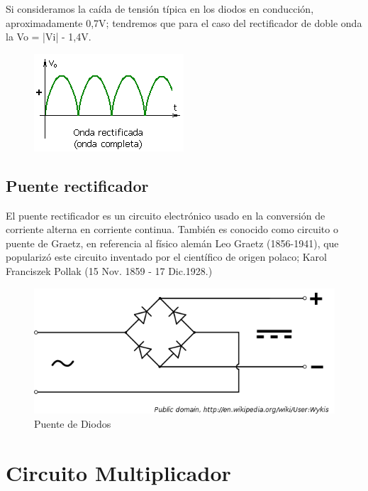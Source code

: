 \documentclass{article}
\begin{document}
   

Si consideramos la caída de tensión típica en los diodos en conducción, aproximadamente 0,7V; tendremos que para el caso del rectificador de doble onda la Vo = |Vi| - 1,4V.\citep{circuitoOnda}\\


\begin{figure}[h!]
    \centering
    \includegraphics[scale=0.8]{OndaCompleta.png}
    \label{fig:my_label}
\end{figure}

\subsection{Puente rectificador}

El puente rectificador es un circuito electrónico usado en la conversión de corriente alterna en corriente continua. También es conocido como circuito o puente de Graetz, en referencia al físico alemán Leo Graetz (1856-1941), que popularizó este circuito inventado por el científico de origen polaco; Karol Franciszek Pollak (15 Nov. 1859 - 17 Dic.1928.)\citep{puente}



\begin{figure}[h!]
    \centering
    \includegraphics[scale=0.5]{PuenteDiodos.png}
    \caption{Puente de Diodos}
    \label{fig:puente de diodos}
\end{figure}


\section{Circuito Multiplicador}
\end{document}
